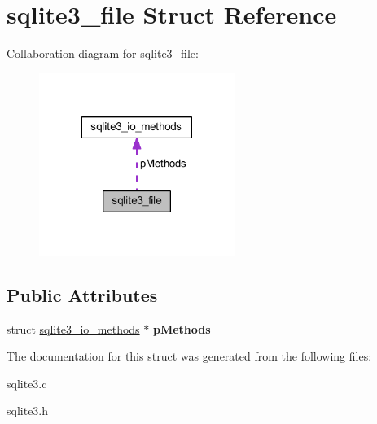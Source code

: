 \hypertarget{structsqlite3__file}{\section{sqlite3\-\_\-file Struct Reference}
\label{structsqlite3__file}
}


Collaboration diagram for sqlite3\-\_\-file\-:\nopagebreak
\begin{figure}[H]
\begin{center}
\leavevmode
\includegraphics[width=180pt]{structsqlite3__file__coll__graph}
\end{center}
\end{figure}
\subsection*{Public Attributes}
\begin{DoxyCompactItemize}
\item 
\hypertarget{structsqlite3__file_afb7c7beec15f0867d22f5260fcee24d3}{struct \hyperlink{structsqlite3__io__methods}{sqlite3\-\_\-io\-\_\-methods} $\ast$ {\bfseries p\-Methods}}\label{structsqlite3__file_afb7c7beec15f0867d22f5260fcee24d3}

\end{DoxyCompactItemize}


The documentation for this struct was generated from the following files\-:\begin{DoxyCompactItemize}
\item 
sqlite3.\-c\item 
sqlite3.\-h\end{DoxyCompactItemize}
